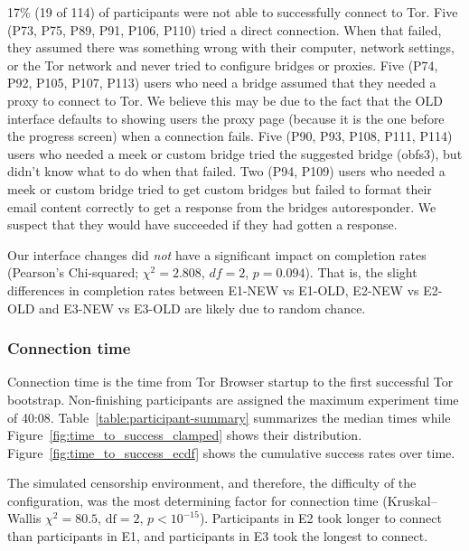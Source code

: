 \documentclass[USenglish,oneside,twocolumn]{article}
\begin{document}
17\% (19 of 114) of participants were not able to successfully connect to Tor. Five (P73, P75, P89, P91, P106, P110) tried a direct connection. When that failed, they assumed there was something wrong with their computer, network settings, or the Tor network and never tried to configure bridges or proxies. Five (P74, P92, P105, P107, P113) users who need a bridge assumed that they needed a proxy to connect to Tor. We believe this may be due to the fact that the OLD interface defaults to showing users the proxy page (because it is the one before the progress screen) when a connection fails. Five (P90, P93, P108, P111, P114) users who needed a meek or custom bridge tried the suggested bridge (obfs3), but didn't know what to do when that failed. Two (P94, P109) users who needed a meek or custom bridge tried to get custom bridges but failed to format their email content correctly to get a response from the bridges autoresponder. We suspect that they would have succeeded if they had gotten a response.

Our interface changes did {\it not} have a significant impact on completion rates (Pearson's Chi-squared; $\chi^2 = 2.808$, $df = 2$, $p = 0.094$). That is, the slight differences in completion rates between E1-NEW vs E1-OLD, E2-NEW vs E2-OLD and E3-NEW vs E3-OLD are likely due to random chance.


\subsubsection{Connection time} 
Connection time is the time from Tor Browser startup to the first successful Tor bootstrap. Non-finishing participants are assigned the maximum experiment time of 40:08. Table~\ref{table:participant-summary} summarizes the median times while Figure~\ref{fig:time_to_success_clamped} shows their distribution. Figure~\ref{fig:time_to_success_ecdf} shows the cumulative success rates over time. 

The simulated censorship environment, and therefore, the difficulty of the configuration, was the most determining factor for connection time (Kruskal--Wallis $\chi^2 = 80.5$, $\mbox{df} = 2$, $p < 10^{-15}$). Participants in E2 took longer to connect than participants in E1, and participants in E3 took the longest to connect.
\end{document}
